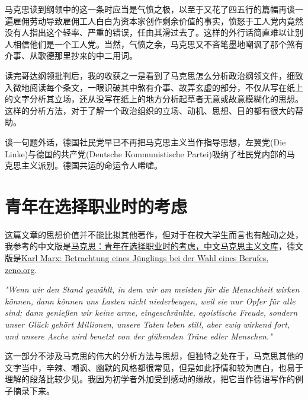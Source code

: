 \documentclass[a4paper]{article}
\begin{document}
马克思读到纲领中的这一条时应当是气愤之极，以至于又花了四五行的篇幅再谈一遍雇佣劳动导致雇佣工人白白为资本家创作剩余价值的事实，愤怒于工人党内竟然没有人指出这个轻率、严重的错误，任由其滑过去了。这样的外行话简直难以让别人相信他们是一个工人党。当然，气愤之余，马克思又不吝笔墨地嘲讽了那个煞有介事、从歌德那里抄来的中二用词。

读完哥达纲领批判后，我的收获之一是看到了马克思怎么分析政治纲领文件，细致入微地阅读每个条文，一眼识破其中煞有介事、故弄玄虚的部分，不仅从写在纸上的文字分析其立场，还从没写在纸上的地方分析起草者无意或故意模糊化的思想。这样的分析方法，对于了解一个政治组织的立场、动机、思想、目的都有很大的帮助。

谈一句题外话，德国社民党早已不再把马克思主义当作指导思想，左翼党(Die Linke)与德国的共产党(Deutsche Kommunistische Partei)吸纳了社民党内部的马克思主义派别。德国共运的命运令人唏嘘。
\section{青年在选择职业时的考虑}
这篇文章的思想价值并不能比拟其他著作，但对于在校大学生而言也有触动之处，我参考的中文版是\href{https://www.marxists.org/chinese/marx/marxist.org-chinese-marx-1835-8.htm}{马克思：青年在选择职业时的考虑，中文马克思主义文库}，德文版是\href{http://www.zeno.org/Philosophie/M/Marx,+Karl/Betrachtungen+eines+J%C3%BCnglings+bei+der+Wahl+seines+Berufes}{Karl Marx: Betrachtung eines Jünglings bei der Wahl eines Berufes, zeno.org}.

\emph{"Wenn wir den Stand gewählt, in dem wir am meisten für die Menschheit wirken können, dann können uns Lasten nicht niederbeugen, weil sie nur Opfer für alle sind; dann genießen wir keine arme, eingeschränkte, egoistische Freude, sondern unser Glück gehört Millionen, unsere Taten leben still, aber ewig wirkend fort, und unsere Asche wird benetzt von der glühenden Träne edler Menschen."}

这一部分不涉及马克思的伟大的分析方法与思想，但独特之处在于，马克思其他的文字当中，辛辣、嘲讽、幽默的风格都很常见，但是如此抒情和较为直白，也易于理解的段落比较少见。我因为初学者外加受到感动的缘故，把它当作德语写作的例子摘录下来。
\end{document}
